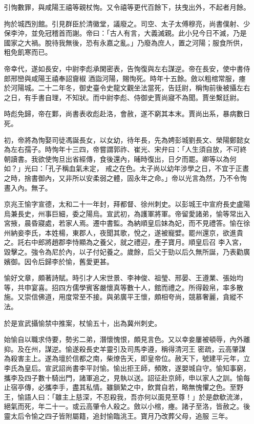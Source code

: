 \begin{pinyinscope}
 引恂數罪，與咸陽王禧等親杖恂。又令禧等更代百餘下，扶曳出外，不起者月餘。



 拘於城西別館。引見群臣於清徽堂，議廢之。司空、太子太傅穆亮，尚書僕射、少保李沖，並免冠稽首而謝。帝曰：「古人有言，大義滅親。此小兒今日不滅，乃是國家之大禍。脫待我無後，恐有永嘉之亂。」乃廢為庶人，置之河陽；服食所供，粗免飢寒而已。



 帝幸代，遂如長安，中尉李彪承閑密表，告恂復與左右謀逆。帝在長安，使中書侍郎邢巒與咸陽王禧奉詔齎椒
 酒詣河陽，賜恂死。時年十五餘。斂以粗棺常服，瘞於河陽城。二十二年冬，御史臺令史龍文觀坐法當死，告廷尉，稱恂前後被攝左右之日，有手書自理，不知狀。而中尉李彪、侍御史賈尚寢不為聞。賈坐繫廷尉。



 時彪免歸，帝在鄴，尚書表收彪赴洛，會赦，遂不窮其本末。賈尚出系，暴病數日死。



 初，帝將為恂娶司徒馮誕長女，以女幼，待年長，先為娉彭城劉長文、榮陽鄭懿女為左右孺子。時恂年十三四，帝嘗謂郭祚、崔光、宋弁曰：「人生須自放，不可終朝讀書。我欲使恂旦出省經傳，食後還內，晡時復出，日夕而罷。卿等以為何如？」光曰：「孔子稱血氣未定，
 戒之在色。太子尚以幼年涉學之日，不宜于正晝之時，捨書御內，又非所以安柔弱之體，固永年之命。」帝以光言為然，乃不令恂晝入內。無子。



 京兆王愉字宣德，太和二十一年封，拜都督、徐州刺史。以彭城王中宣府長史盧陽烏兼長史，州事巨細，委之陽烏。宣武初，為護軍將軍。帝留愛諸弟，愉等常出入宮掖，晨昏寢處，若家人焉。遷中書監。為納順皇后妹為妃，而不見禮答。愉在徐州納妾李氏，本姓楊，東郡人，夜聞其歌，悅之，遂被寵嬖。罷州還京，欲進貴之。託右中郎將趙郡李恃顯為之養父，就之禮迎，產子寶月。順皇后召
 李入宮，毀擊之。強令為尼於內，以子付妃養之。歲餘，后父于勁以后久無所誕，乃表勸廣嬪御。因令后歸李於愉，舊愛更甚。



 愉好文章，頗著詩賦。時引才人宋世景、李神俊、祖瑩、邢晏、王遵業、張始均等，共申宴喜。招四方儒學賓客嚴懷真等數十人，館而禮之。所得穀帛，率多散施。又崇信佛道，用度常至不接。與弟廣平王懷，頗相夸尚，競慕奢麗，貪縱不法。



 於是宣武攝愉禁中推案，杖愉五十，出為冀州刺史。



 始愉自以職求侍要，勢劣二弟，潛懷愧恨，頗見言色。又以幸妾屢被頓辱，內外離抑。及在州，謀逆。愉遂殺長史羊靈引及司馬李遵，稱得清河王
 密疏，云高肇謀為殺害主上。遂為壇於信都之南，柴燎告天，即皇帝位。赦天下，號建平元年，立李氏為皇后。宣武詔尚書李平討愉。愉出拒王師，頻敗，遂嬰城自守。愉知事窮，攜李及四子數十騎出門，諸軍追之，見執以送。詔征赴京師，申以家人之訓。愉每止宿亭傳，必攜李手，盡其私情。雖鎖縶之中，飲賞自若，略無愧懼之色。至野王，愉語人曰：「雖主上慈深，不忍殺我，吾亦何以面見至尊！」於是歔欷流涕，絕氣而死，年二十一。或云高肇令人殺之。斂以小棺，瘞。諸子至洛，皆赦之。後靈太后令愉之四子皆附屬籍，追封愉臨洮王。寶月乃改葬父母，追服
 三年。




\end{pinyinscope}
